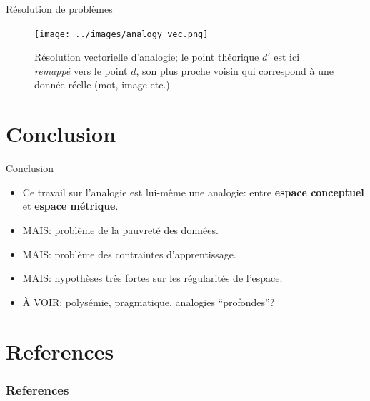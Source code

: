\documentclass[xcolor=table, hyperref={pdfpagelabels=false}]{beamer}
\begin{document}
\begin{frame}{Résolution de problèmes}
\begin{figure}[H]
	\centering
	\texttt{[image: ../images/analogy\_vec.png]}
	\caption{Résolution vectorielle d'analogie; le point théorique $d'$ est ici \textit{remappé} vers le point $d$, son plus proche voisin qui correspond à une donnée réelle (mot, image etc.)}
\end{figure}
\end{frame}
\section{Conclusion}
\begin{frame}
\begin{block}{Conclusion}\pause
	\begin{itemize}
		\item Ce travail sur l'analogie est lui-même une analogie: entre \textbf{espace conceptuel} et \textbf{espace métrique}.\pause
		\item MAIS: problème de la pauvreté des données.\pause
		\item MAIS: problème des contraintes d'apprentissage.\pause
		\item MAIS: hypothèses très fortes sur les régularités de l'espace.\pause
		\item À VOIR: polysémie, pragmatique, analogies ``profondes''?
	\end{itemize}
\end{block}
\end{frame}
\section*{References}
\begin{frame}[allowframebreaks]
\frametitle{References}
\nocite{*}


\end{frame}
\end{document}

